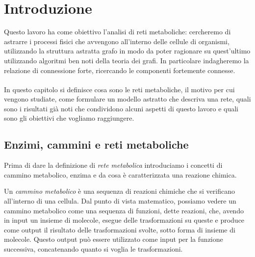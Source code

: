 \chapter{Introduzione}
\label{chapter:introduction}
Questo lavoro ha come obiettivo l'analisi di reti metaboliche:
cercheremo di astrarre i processi fisici che avvengono all'interno
delle cellule di organismi, utilizzando la struttura astratta grafo in
modo da poter ragionare su quest'ultimo utilizzando algoritmi ben noti
della teoria dei grafi. In particolare indagheremo la relazione di
connessione forte, ricercando le componenti fortemente connesse.
\\\\
In questo capitolo si definisce cosa sono le reti metaboliche, il
motivo per cui vengono studiate, come formulare un modello astratto
che descriva una rete, quali sono i risultati gi\`a noti che
condividono alcuni aspetti di questo lavoro e quali sono gli obiettivi
che vogliamo raggiungere.




\section{Enzimi, cammini e reti metaboliche}

Prima di dare la definizione di \emph{rete metabolica} introduciamo i
concetti di cammino metabolico, enzima e da cosa \`e caratterizzata
una reazione chimica.

Un \emph{cammino metabolico} \`e una sequenza di reazioni chimiche che
si verificano all'interno di una cellula. Dal punto di vista
matematico, possiamo vedere un cammino metabolico come una sequenza di
funzioni, dette reazioni, che, avendo in input un insieme di molecole,
esegue delle trasformazioni su queste e produce come output il
risultato delle trasformazioni svolte, sotto forma di insieme di
molecole. Questo output pu\`o essere utilizzato come input per la
funzione successiva, concatenando quanto si voglia le trasformazioni.

